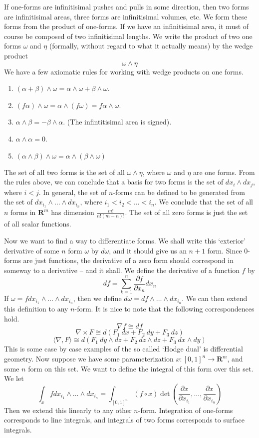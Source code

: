 \documentclass[12pt]{amsbook}
\theoremstyle{plain}
\theoremstyle{definition}
\begin{document}
If one-forms are infinitisimal pushes and pulls in some direction, then two forms are infinitisimal areas, three forms are infinitisimal volumes, etc. We form these forms from the product of one-forms. If we have an infinitisimal area, it must of course be composed of two infinitisimal lengths. We write the product of two one forms $\omega$ and $\eta$ (formally, without regard to what it actually means) by the wedge product
%
\[ \omega \wedge \eta \]
%
We have a few axiomatic rules for working with wedge products on one forms.
%
\begin{enumerate}
    \item $(\alpha + \beta) \wedge \omega = \alpha \wedge \omega + \beta \wedge \omega$.
    \item $(f \alpha) \wedge \omega = \alpha \wedge (f \omega) = f \alpha \wedge \omega$.
    \item $\alpha \wedge \beta = - \beta \wedge \alpha$. (The infintitisimal area is signed).
    \item $\alpha \wedge \alpha = 0$.
    \item $(\alpha \wedge \beta) \wedge \omega = \alpha \wedge (\beta \wedge \omega)$
\end{enumerate}
%
The set of all two forms is the set of all $\omega \wedge \eta$, where $\omega$ and $\eta$ are one forms. From the rules above, we can conclude that a basis for two forms is the set of $dx_i \wedge dx_j$, where $i < j$. In general, the set of $n$-forms can be defined to be generated from the set of $dx_{i_1} \wedge \dots \wedge dx_{i_n}$, where $i_1 < i_2 < \dots < i_n$. We conclude that the set of all $n$ forms in $\mathbf{R}^m$ has dimension $\frac{m!}{n!(m - n)!}$. The set of all zero forms is just the set of all scalar functions.

Now we want to find a way to differentiate forms. We shall write this `exterior' derivative of some $n$ form $\omega$ by $d\omega$, and it should give us an $n + 1$ form. Since 0-forms are just functions, the derivative of a zero form should correspond in someway to a derivative -- and it shall. We define the derivative of a function $f$ by
%
\[ df = \sum_{k = 1}^n \frac{\partial f}{\partial x_n} dx_n \]
%
If $\omega = f dx_{i_1} \wedge \dots \wedge dx_{i_n}$, then we define $d\omega = df \wedge \dots \wedge dx_{i_n}$. We can then extend this definition to any $n$-form. It is nice to note that the following correspondences hold.
%
\[ \nabla f \cong df \]
\[ \nabla \times F \cong d(F_1\ dx + F_2\ dy + F_3\ dz) \]
\[ \langle \nabla, F \rangle \cong d(F_1\ dy \wedge dz + F_2\ dz \wedge dz + F_3\ dx \wedge dy) \]
%
This is some case by case examples of the so called `Hodge dual' is differential geometry. Now suppose we have some parameterization $x:[0,1]^n \to \mathbf{R}^m$, and some $n$ form on this set. We want to define the integral of this form over this set. We let
%
\[ \int_x f dx_{i_1} \wedge \dots \wedge dx_{i_n} = \int_{[0,1]^n} (f \circ x) \det(\frac{\partial x}{\partial x_{i_1}}, \dots, \frac{\partial x}{\partial x_{i_n}}) \]
%
Then we extend this linearly to any other $n$-form. Integration of one-forms corresponds to line integrals, and integrals of two forms corresponds to surface integrals.
\end{document}
